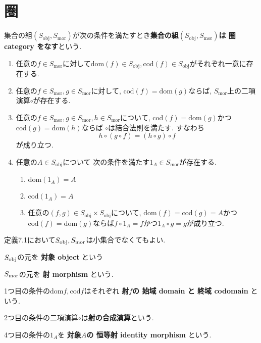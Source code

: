 \section{圏}
\begin{Def}
集合の組$(S_{\mathrm{obj}},S_{\mathrm{mor}})$が次の条件を満たすとき{\bf 集合の組$(S_{\mathrm{obj}},S_{\mathrm{mor}})$は
圏 category
をなす}という.
\begin{enumerate}
\item 任意の$f\in S_\mathrm{mor}$に対して$\mathrm{dom}(f)\in S_\mathrm{obj},\mathrm{cod}(f)\in S_\mathrm{obj}$がそれぞれ一意に存在する.
\item 任意の$f\in S_{\mathrm{mor}},g\in S_{\mathrm{mor}}$に対して,
$\mathrm{cod}(f)=\mathrm{dom}(g)$ならば,
$S_{\mathrm{mor}}$上の二項演算$\circ$が存在する.
\item 任意の$f\in S_{\mathrm{mor}},g\in S_{\mathrm{mor}},h\in S_{\mathrm{mor}}$について, $\mathrm{cod}(f)=\mathrm{dom}(g)$かつ$ \mathrm{cod}(g)=\mathrm{dom}(h)
$ならば
$\circ$は結合法則を満たす.
すなわち
\[
h\circ(g\circ f)=(h\circ g)\circ f
\]
が成り立つ.
\item 任意の$A\in S_{\mathrm{obj}}$について
次の条件を満たす$1_A\in S_{\mathrm{mor}}$が存在する.
\begin{enumerate}
\item
$\mathrm{dom}(1_{A})=A$
\item
$\mathrm{cod}(1_A)=A$
\item 任意の$(f,g)\in S_{\mathrm{obj}}\times S_{\mathrm{obj}}$について, $\mathrm{dom}(f)=\mathrm{cod} (g)=A$かつ$\mathrm{cod} (f)=\mathrm{dom}(g)$ならば$f\circ 1_A=f$かつ$1_A\circ g=g$が成り立つ.
\end{enumerate}
\end{enumerate}
\end{Def}
\begin{caution}
定義7.1において$S_{\rm obj},S_{\rm mor}$は小集合でなくてもよい.
\end{caution}
\begin{Def}
$S_{\rm obj}$の元を
{\bf 
対象 object
}という 
\end{Def}
\begin{Def}
$S_{\rm mor}$の元を
{\bf 
射 morphism
}という.
\end{Def}
\begin{Def}
1つ目の条件の$\mathrm{dom} f,\mathrm{cod} f$はそれぞれ
{\bf 射$f$の
始域 domain
と 
終域 codomain
}という. 
\end{Def}
\begin{Def}
2つ目の条件の二項演算$\circ$は{\bf 射の合成演算}という.
\end{Def}
\begin{Def}
4つ目の条件の$1_A$を
{\bf 対象$A$の
恒等射 identity morphism
}という.
\end{Def}

